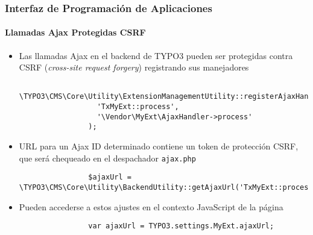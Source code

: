 \begin{frame}[fragile]
	\frametitle{Interfaz de Programación de Aplicaciones}
	\framesubtitle{Llamadas Ajax Protegidas CSRF}

	\lstset{
		basicstyle=\tiny\ttfamily
	}

	\begin{itemize}
		\item Las llamadas Ajax en el backend de TYPO3 pueden ser protegidas contra CSRF (\textit{cross-site request forgery}) registrando sus manejadores

			\begin{lstlisting}
				\TYPO3\CMS\Core\Utility\ExtensionManagementUtility::registerAjaxHandler(
				  'TxMyExt::process',
				  '\Vendor\MyExt\AjaxHandler->process'
				);
			\end{lstlisting}

		\item URL para un Ajax ID determinado contiene un token de protección CSRF, que será chequeado en el despachador \texttt{ajax.php}

			\begin{lstlisting}
				$ajaxUrl = \TYPO3\CMS\Core\Utility\BackendUtility::getAjaxUrl('TxMyExt::process');
			\end{lstlisting}

		\item Pueden accederse a estos ajustes en el contexto JavaScript de la página

			\begin{lstlisting}
				var ajaxUrl = TYPO3.settings.MyExt.ajaxUrl;
			\end{lstlisting}

	\end{itemize}

\end{frame}


